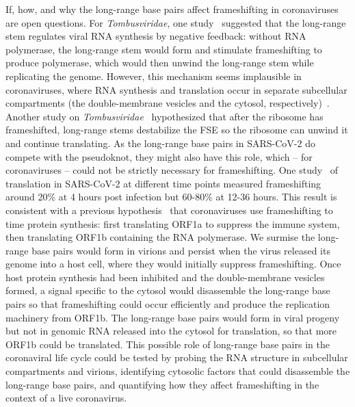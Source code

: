 \documentclass[main.tex]{subfiles}
\begin{document}
If, how, and why the long-range base pairs affect frameshifting in coronaviruses are open questions.
For \textit{Tombusviridae}, one study~\cite{Barry2002} suggested that the long-range stem regulates viral RNA synthesis by negative feedback: without RNA polymerase, the long-range stem would form and stimulate frameshifting to produce polymerase, which would then unwind the long-range stem while replicating the genome.
However, this mechanism seems implausible in coronaviruses, where RNA synthesis and translation occur in separate subcellular compartments (the double-membrane vesicles and the cytosol, respectively)~\cite{Wolff2020}.
Another study on \textit{Tombusviridae}~\cite{Mikkelsen2023} hypothesized that after the ribosome has frameshifted, long-range stems destabilize the FSE so the ribosome can unwind it and continue translating.
As the long-range base pairs in SARS-CoV-2 do compete with the pseudoknot, they might also have this role, which -- for coronaviruses -- could not be strictly necessary for frameshifting.
One study~\cite{Kim2021} of translation in SARS-CoV-2 at different time points measured frameshifting around 20\% at 4 hours post infection but 60-80\% at 12-36 hours.
This result is consistent with a previous hypothesis~\cite{Kelly2021} that coronaviruses use frameshifting to time protein synthesis: first translating ORF1a to suppress the immune system, then translating ORF1b containing the RNA polymerase.
We surmise the long-range base pairs would form in virions and persist when the virus released its genome into a host cell, where they would initially suppress frameshifting.
Once host protein synthesis had been inhibited and the double-membrane vesicles formed, a signal specific to the cytosol would disassemble the long-range base pairs so that frameshifting could occur efficiently and produce the replication machinery from ORF1b.
The long-range base pairs would form in viral progeny but not in genomic RNA released into the cytosol for translation, so that more ORF1b could be translated.
This possible role of long-range base pairs in the coronaviral life cycle could be tested by probing the RNA structure in subcellular compartments and virions, identifying cytosolic factors that could disassemble the long-range base pairs, and quantifying how they affect frameshifting in the context of a live coronavirus.
\end{document}
